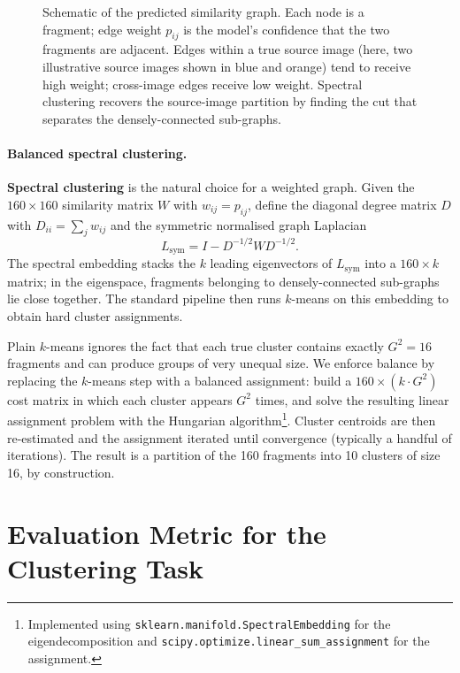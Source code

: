 \documentclass[12pt, a4paper]{article}
\begin{document}
\begin{figure}[h]
\centering

\caption{Schematic of the predicted similarity graph. Each node is a fragment; edge
weight $p_{ij}$ is the model's confidence that the two fragments are adjacent.
Edges within a true source image (here, two illustrative source images shown in blue
and orange) tend to receive high weight; cross-image edges receive low weight.
Spectral clustering recovers the source-image partition by finding the cut that
separates the densely-connected sub-graphs.}
\label{fig:similarity-graph}
\end{figure}

\paragraph{Balanced spectral clustering.}
\textbf{Spectral clustering} is the natural choice for a weighted graph. Given the
$160 \times 160$ similarity matrix $W$ with $w_{ij} = p_{ij}$, define the diagonal
degree matrix $D$ with $D_{ii} = \sum_j w_{ij}$ and the symmetric normalised graph
Laplacian
\[
L_{\text{sym}} = I - D^{-1/2} W D^{-1/2}.
\]
The spectral embedding stacks the $k$ leading eigenvectors of $L_{\text{sym}}$ into a
$160 \times k$ matrix; in the eigenspace, fragments belonging to densely-connected
sub-graphs lie close together. The standard pipeline then runs $k$-means on this
embedding to obtain hard cluster assignments.

Plain $k$-means ignores the fact that each true cluster contains exactly $G^2 = 16$
fragments and can produce groups of very unequal size. We enforce balance by replacing
the $k$-means step with a balanced assignment: build a $160 \times (k \cdot G^2)$ cost
matrix in which each cluster appears $G^2$ times, and solve the resulting linear
assignment problem with the Hungarian algorithm\footnote{Implemented using
\texttt{sklearn.manifold.SpectralEmbedding} for the eigendecomposition and
\texttt{scipy.optimize.linear\_sum\_assignment} for the assignment.}. Cluster
centroids are then re-estimated and the assignment iterated until convergence
(typically a handful of iterations). The result is a partition of the 160 fragments
into 10 clusters of size 16, by construction.

\section{Evaluation Metric for the Clustering Task}
\end{document}
